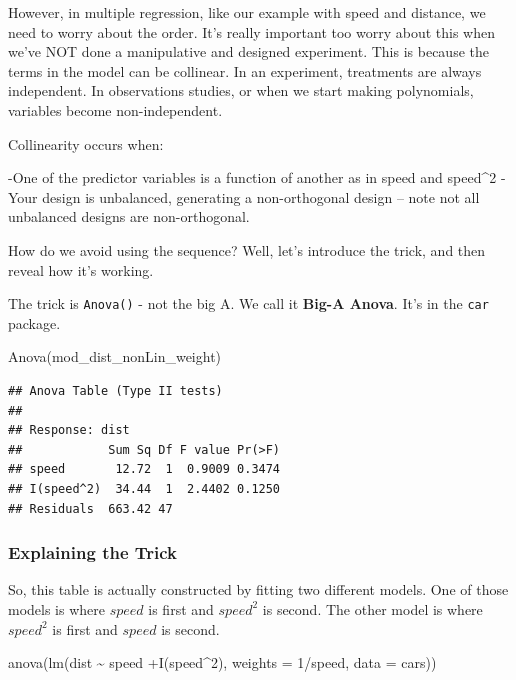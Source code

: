 \documentclass[
]{book}
\newenvironment{Shaded}{\begin{snugshade}}{\end{snugshade}}
\newcommand{\AttributeTok}[1]{\textcolor[rgb]{0.77,0.63,0.00}{#1}}
\newcommand{\DecValTok}[1]{\textcolor[rgb]{0.00,0.00,0.81}{#1}}
\newcommand{\FunctionTok}[1]{\textcolor[rgb]{0.00,0.00,0.00}{#1}}
\newcommand{\NormalTok}[1]{#1}
\newcommand{\SpecialCharTok}[1]{\textcolor[rgb]{0.00,0.00,0.00}{#1}}
\begin{document}
However, in multiple regression, like our example with speed and distance, we need to worry about the order. It's really important too worry about this when we've NOT done a manipulative and designed experiment. This is because the terms in the model can be collinear. In an experiment, treatments are always independent. In observations studies, or when we start making polynomials, variables become non-independent.

Collinearity occurs when:

-One of the predictor variables is a function of another as in speed and speed\^{}2
-Your design is unbalanced, generating a non-orthogonal design -- note not all unbalanced designs are non-orthogonal.

How do we avoid using the sequence? Well, let's introduce the trick, and then reveal how it's working.

The trick is \texttt{Anova()} - not the big A. We call it \textbf{Big-A Anova}. It's in the \texttt{car} package.

\begin{Shaded}
\begin{Highlighting}[]
\FunctionTok{Anova}\NormalTok{(mod\_dist\_nonLin\_weight)}
\end{Highlighting}
\end{Shaded}

\begin{verbatim}
## Anova Table (Type II tests)
## 
## Response: dist
##            Sum Sq Df F value Pr(>F)
## speed       12.72  1  0.9009 0.3474
## I(speed^2)  34.44  1  2.4402 0.1250
## Residuals  663.42 47
\end{verbatim}

\hypertarget{explaining-the-trick}{%
\subsubsection{Explaining the Trick}\label{explaining-the-trick}}

So, this table is actually constructed by fitting two different models. One of those models is where \(speed\) is first and \(speed^{2}\) is second. The other model is where \(speed^{2}\) is first and \(speed\) is second.

\begin{Shaded}
\begin{Highlighting}[]
\FunctionTok{anova}\NormalTok{(}\FunctionTok{lm}\NormalTok{(dist }\SpecialCharTok{\textasciitilde{}}\NormalTok{ speed }\SpecialCharTok{+}\FunctionTok{I}\NormalTok{(speed}\SpecialCharTok{\^{}}\DecValTok{2}\NormalTok{), }\AttributeTok{weights =} \DecValTok{1}\SpecialCharTok{/}\NormalTok{speed, }\AttributeTok{data =}\NormalTok{ cars))}
\end{Highlighting}
\end{Shaded}
\end{document}
